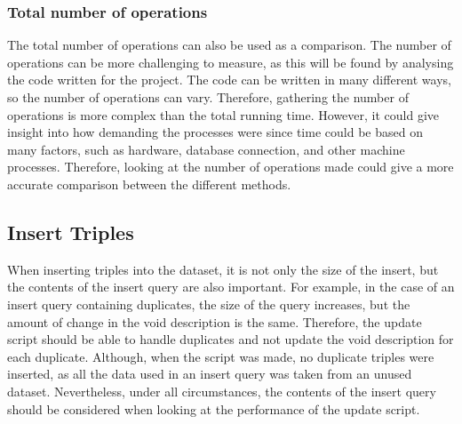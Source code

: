 \subsubsection{Total number of operations}
The total number of operations can also be used as a comparison.
The number of operations can be more challenging to measure, as this will be found by analysing the code written for the project. The code can be written in many different ways, so the number of operations can vary. Therefore, gathering the number of operations is more complex than the total running time. However, it could give insight into how demanding the processes were since time could be based on many factors, such as hardware, database connection, and other machine processes. Therefore, looking at the number of operations made could give a more accurate comparison between the different methods.


\subsection{Insert Triples}\label{sec:insert-triples}
When inserting triples into the dataset, it is not only the size of the insert, but the contents of the insert query are also important. For example, in the case of an insert query containing duplicates, the size of the query increases, but the amount of change in the \gls{void} description is the same. Therefore, the update script should be able to handle duplicates and not update the \gls{void} description for each duplicate. Although, when the script was made, no duplicate triples were inserted, as all the data used in an insert query was taken from an unused dataset. Nevertheless, under all circumstances, the contents of the insert query should be considered when looking at the performance of the update script.




